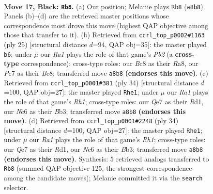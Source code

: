 \documentclass[11pt]{article}
\begin{document}
\clearpage

\begin{figure}[p]\centering
\begin{subfigure}{0.46\textwidth}\centering
\resizebox{\linewidth}{!}{%
\newchessgame
\chessboard[
  setfen={r1b2r2/p1ppqp2/2n1p2k/1QP3pp/4n3/2B2NP1/PP2PP1P/R3KB1R b - - 2 17},
  showmover=false,
  pgfstyle=straightmove, color=movearrow, markmove={a8-b8}
]}
\caption{}
\end{subfigure}\hfill
\begin{subfigure}{0.46\textwidth}\centering
\resizebox{\linewidth}{!}{%
\newchessgame
\chessboard[
  setfen={r1bq1rk1/pp3ppp/4p3/n2p4/2PPn3/3QBNP1/P3PPBP/R1R3K1 b - - 1 13},
  showmover=false,
  pgfstyle=straightmove, color=movearrow, markmove={b7-b6}
]}
\caption{}
\end{subfigure}
\\[4pt]
\begin{subfigure}{0.46\textwidth}\centering
\resizebox{\linewidth}{!}{%
\newchessgame
\chessboard[
  setfen={r3k2r/1p1b1p1p/1q2p1p1/p1npP3/3N1P2/PBQ5/1PP3PP/1K1R3R w kq - 2 18},
  showmover=false,
  pgfstyle=straightmove, color=movearrow, markmove={h1-e1}
]}
\caption{}
\end{subfigure}\hfill
\begin{subfigure}{0.46\textwidth}\centering
\resizebox{\linewidth}{!}{%
\newchessgame
\chessboard[
  setfen={r3k2r/1p1b1p1p/1q2p1p1/p1npP3/3N1P2/PBQ5/1PP3PP/1K1R3R w kq - 0 18},
  showmover=false,
  pgfstyle=straightmove, color=movearrow, markmove={h1-e1}
]}
\caption{}
\end{subfigure}
\caption{\textbf{Move 17, Black: \texttt{Rb8}.} (a) Our position; Melanie plays \texttt{Rb8} (\texttt{a8b8}). Panels (b)--(d) are the retrieved master positions whose correspondence most drove this move (highest QAP objective among those that transfer to it). (b) Retrieved from \texttt{ccrl\_top\_p0002\#1163} (ply 25) [structural distance $d$=94, QAP obj=35]: the master played \texttt{b6}; under $\mu$ our \emph{Ra1} plays the role of that game's \emph{Pb2} (a \textbf{cross-type} correspondence); cross-type roles: our \emph{B}c8 as their \emph{R}a8, our \emph{P}c7 as their \emph{B}c8; transferred move \texttt{a8b8} \textbf{(endorses this move)}. (c) Retrieved from \texttt{ccrl\_top\_p0001\#381} (ply 34) [structural distance $d$=100, QAP obj=27]: the master played \texttt{Rhe1}; under $\mu$ our \emph{Ra1} plays the role of that game's \emph{Rh1}; cross-type roles: our \emph{Q}e7 as their \emph{R}d1, our \emph{N}c6 as their \emph{B}b3; transferred move \texttt{a8b8} \textbf{(endorses this move)}. (d) Retrieved from \texttt{ccrl\_top\_p0001\#2248} (ply 34) [structural distance $d$=100, QAP obj=27]: the master played \texttt{Rhe1}; under $\mu$ our \emph{Ra1} plays the role of that game's \emph{Rh1}; cross-type roles: our \emph{Q}e7 as their \emph{R}d1, our \emph{N}c6 as their \emph{B}b3; transferred move \texttt{a8b8} \textbf{(endorses this move)}. Synthesis: 5 retrieved analogs transferred to \texttt{Rb8} (summed QAP objective 125, the strongest correspondence among the candidate moves); Melanie committed it via the \texttt{search} selector.}
\label{fig:thought-m33}
\end{figure}
\end{document}
